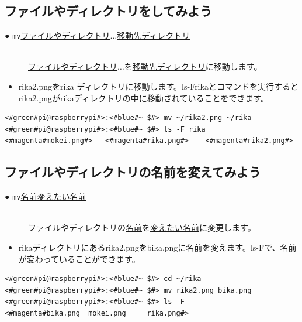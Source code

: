 \documentclass[text03.tex]{subfiles}
\begin{document}
\newpage
\subsection{ファイルやディレクトリをしてみよう}
\begin{description}
\item[● \texttt{mv}\textvisiblespace \underline{ファイルやディレクトリ}$\ldots$\textvisiblespace \underline{移動先ディレクトリ}]\mbox{}\\
\underline{ファイルやディレクトリ}$\ldots$を\underline{移動先ディレクトリ}に移動します。
\end{description}
\begin{itemize}
\item[<例>]rika2.pngをrika ディレクトリに移動します。ls\textvisiblespace -F\textvisiblespace rikaとコマンドを実行するとrika2.pngがrikaディレクトリの中に移動されていることをできます。
\end{itemize}
\begin{lstlisting}[caption=mvの例, label=mv]
<#green#pi@raspberrypi#>:<#blue#~ $#> mv ~/rika2.png ~/rika
<#green#pi@raspberrypi#>:<#blue#~ $#> ls -F rika
<#magenta#mokei.png#>	<#magenta#rika.png#>	<#magenta#rika2.png#>
\end{lstlisting}


\subsection{ファイルやディレクトリの名前を変えてみよう}
\begin{description}
\item[● \texttt{mv}\textvisiblespace \underline{名前}\textvisiblespace \underline{変えたい名前}]\mbox{}\\
ファイルやディレクトリの\underline{名前}を\underline{変えたい名前}に変更します。
\end{description}
\begin{itemize}
\item[<例>]rikaディレクトリにあるrika2.pngをbika.pngに名前を変えます。ls\textvisiblespace -Fで、名前が変わっていることができます。
\end{itemize}
\begin{lstlisting}[caption=ファイル名を変える, label=mvName]
<#green#pi@raspberrypi#>:<#blue#~ $#> cd ~/rika
<#green#pi@raspberrypi#>:<#blue#~ $#> mv rika2.png bika.png
<#green#pi@raspberrypi#>:<#blue#~ $#> ls -F
<#magenta#bika.png	mokei.png     rika.png#>
\end{lstlisting}
\end{document}
